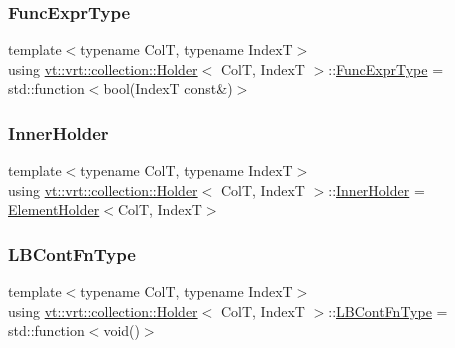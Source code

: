 \mbox{\label{structvt_1_1vrt_1_1collection_1_1_holder_a5c28963c09fd935028444c5a09fada2d}} 
\subsubsection{\texorpdfstring{Func\+Expr\+Type}{FuncExprType}}
{\footnotesize\ttfamily template$<$typename ColT, typename IndexT$>$ \\
using \hyperlink{structvt_1_1vrt_1_1collection_1_1_holder}{vt\+::vrt\+::collection\+::\+Holder}$<$ ColT, IndexT $>$\+::\hyperlink{structvt_1_1vrt_1_1collection_1_1_holder_a5c28963c09fd935028444c5a09fada2d}{Func\+Expr\+Type} =  std\+::function$<$bool(IndexT const\&)$>$}

\mbox{\label{structvt_1_1vrt_1_1collection_1_1_holder_aafc9b515450179bad7f03e17010b59f8}} 
\subsubsection{\texorpdfstring{Inner\+Holder}{InnerHolder}}
{\footnotesize\ttfamily template$<$typename ColT, typename IndexT$>$ \\
using \hyperlink{structvt_1_1vrt_1_1collection_1_1_holder}{vt\+::vrt\+::collection\+::\+Holder}$<$ ColT, IndexT $>$\+::\hyperlink{structvt_1_1vrt_1_1collection_1_1_holder_aafc9b515450179bad7f03e17010b59f8}{Inner\+Holder} =  \hyperlink{structvt_1_1vrt_1_1collection_1_1_element_holder}{Element\+Holder}$<$ColT, IndexT$>$}

\mbox{\label{structvt_1_1vrt_1_1collection_1_1_holder_a01812f8ee06d3a67e1a9aa2765989913}} 
\subsubsection{\texorpdfstring{L\+B\+Cont\+Fn\+Type}{LBContFnType}}
{\footnotesize\ttfamily template$<$typename ColT, typename IndexT$>$ \\
using \hyperlink{structvt_1_1vrt_1_1collection_1_1_holder}{vt\+::vrt\+::collection\+::\+Holder}$<$ ColT, IndexT $>$\+::\hyperlink{structvt_1_1vrt_1_1collection_1_1_holder_a01812f8ee06d3a67e1a9aa2765989913}{L\+B\+Cont\+Fn\+Type} =  std\+::function$<$void()$>$}

